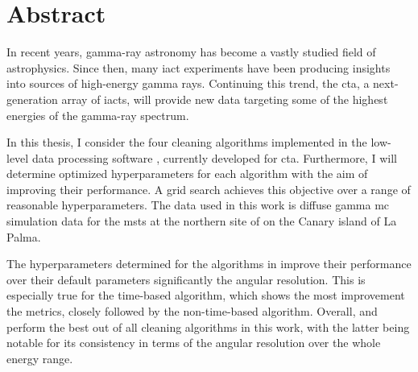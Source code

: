 \thispagestyle{plain}

\section*{Abstract}
In recent years, gamma-ray astronomy has become a vastly studied field of astrophysics.
Since then, many \gls{iact} experiments have been producing insights into sources of
high-energy gamma rays. Continuing this trend, the \gls{cta}, a next-generation array of \glspl{iact},
will provide new data targeting some of the highest energies of the gamma-ray spectrum.

In this thesis, I consider the four cleaning algorithms implemented in the low-level data processing software \ctapipe{},
currently developed for \gls{cta}. Furthermore, I will determine optimized hyperparameters for each algorithm
with the aim of improving their performance. A grid search achieves this objective
over a range of reasonable hyperparameters. The data used in this work is diffuse gamma \gls{mc} simulation data for
the \glspl{mst} at the northern site of \cta{} on the Canary island of La Palma.

The hyperparameters determined for the algorithms in \ctapipe{} improve their performance over
their default parameters significantly \wrt the angular resolution. This is especially true for the
time-based \tcc{} algorithm, which shows the most improvement \wrt the metrics, closely followed by the
non-time-based \mars{} algorithm. Overall, \fact{} and \mars{} perform the best out of all cleaning algorithms in this work,
with the latter being notable for its consistency in terms of the angular resolution over the whole energy range.


